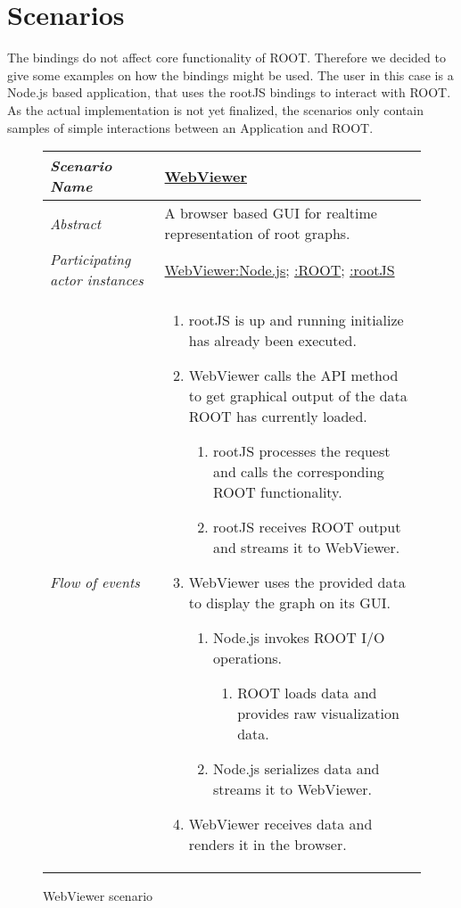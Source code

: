 \section{Scenarios}

The bindings do not affect core functionality of ROOT. Therefore 
we decided to give some examples on how the bindings might be used. The 
user in this case is a Node.js based application, that uses the rootJS bindings 
to interact with ROOT. As the actual implementation is not yet 
finalized, the scenarios only contain samples of simple interactions 
between an Application and ROOT.

\begin{figure}[htb]
	\centering
	\begin{longtable}{p{3cm} @{\hskip 1cm} p{12cm}}
		\hline
		
		\textit{Scenario Name} & \underline{WebViewer}\\
		\hline
	
		\textit{Abstract} & A browser based GUI for realtime representation of root graphs.\\
		\hline
	
		\textit{Participating actor instances} & \underline{WebViewer:Node.js}; \underline{:ROOT}; \underline{:rootJS}\\
		\hline
	
		\textit{Flow of events} & 
		\begin{enumerate}
			\item rootJS is up and running initialize has already been executed.
			
			\item WebViewer calls the API method to get graphical output of the data ROOT has currently loaded.
				\begin{enumerate}
					\item rootJS processes the request and calls the corresponding ROOT functionality.
					\item rootJS receives ROOT output and streams it to WebViewer.
				\end{enumerate}
			\item WebViewer uses the provided data to display the graph on its GUI.
				\begin{enumerate}
					\item Node.js invokes ROOT I/O operations.
						\begin{enumerate}
							\item ROOT loads data and provides raw visualization data.
						\end{enumerate}
					\item Node.js serializes data and streams it to WebViewer.
				\end{enumerate}
			\item WebViewer receives data and renders it in the browser.
		\end{enumerate}
		\\
		\hline
		
	\end{longtable}
	
	\caption{WebViewer scenario}
	
\end{figure}


